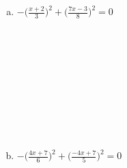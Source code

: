 \documentclass[a4paper,14pt]{article}
\begin{document}
\begin{multicols}{2}
\begin{enumerate}
\begin{enumerate}[a)]
				\item $-\bigg(\frac{x + 2}{3}\bigg)^2 + \bigg(\frac{7x - 3}{8}\bigg)^2 = 0$ \\\\\\\\\\\\\\\\\\\\
				\small\item $-\bigg(\frac{4x + 7}{6}\bigg)^2 + \bigg(\frac{-4x + 7}{5}\bigg)^2 = 0$ \\\\\\\\\\\\\\\\\\\\
			\end{enumerate}
		\end{enumerate}
		$~$ \\ $~$ \\ $~$ \\ $~$ \\ $~$ \\ $~$ \\ $~$ \\ $~$ \\ $~$ 
	\end{multicols}
\end{document}
